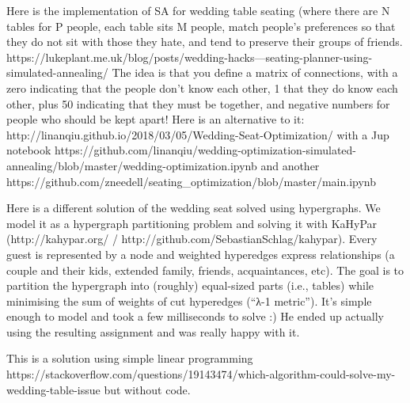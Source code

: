 \documentclass[11pt]{article}
\begin{document}
Here is the implementation of SA for wedding table seating (where there
are N tables for P people, each table sits M people, match people's
preferences so that they do not sit with those they hate, and tend to
preserve their groups of friends.
https://lukeplant.me.uk/blog/posts/wedding-hacks---seating-planner-using-simulated-annealing/
The idea is that you define a matrix of connections, with a zero
indicating that the people don't know each other, 1 that they do know
each other, plus 50 indicating that they must be together, and negative
numbers for people who should be kept apart! Here is an alternative to
it: http://linanqiu.github.io/2018/03/05/Wedding-Seat-Optimization/ with
a Jup notebook
https://github.com/linanqiu/wedding-optimization-simulated-annealing/blob/master/wedding-optimization.ipynb
and another
https://github.com/zneedell/seating\_optimization/blob/master/main.ipynb

Here is a different solution of the wedding seat solved using
hypergraphs. We model it as a hypergraph partitioning problem and
solving it with KaHyPar (http://kahypar.org/ /
http://github.com/SebastianSchlag/kahypar). Every guest is represented
by a node and weighted hyperedges express relationships (a couple and
their kids, extended family, friends, acquaintances, etc). The goal is
to partition the hypergraph into (roughly) equal-sized parts (i.e.,
tables) while minimising the sum of weights of cut hyperedges (``λ-1
metric''). It's simple enough to model and took a few milliseconds to
solve :) He ended up actually using the resulting assignment and was
really happy with it.

This is a solution using simple linear programming
https://stackoverflow.com/questions/19143474/which-algorithm-could-solve-my-wedding-table-issue
but without code.
\end{document}
